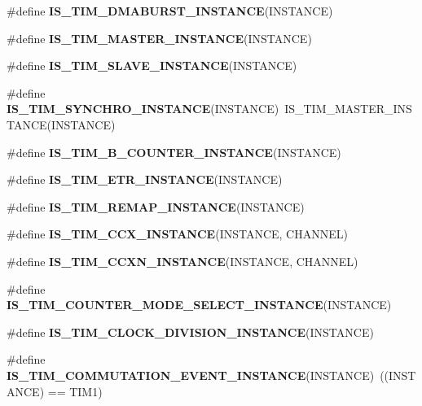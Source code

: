 \begin{DoxyCompactItemize}
\item 
\#define {\bfseries I\+S\+\_\+\+T\+I\+M\+\_\+\+D\+M\+A\+B\+U\+R\+S\+T\+\_\+\+I\+N\+S\+T\+A\+N\+CE}(I\+N\+S\+T\+A\+N\+CE)
\item 
\#define {\bfseries I\+S\+\_\+\+T\+I\+M\+\_\+\+M\+A\+S\+T\+E\+R\+\_\+\+I\+N\+S\+T\+A\+N\+CE}(I\+N\+S\+T\+A\+N\+CE)
\item 
\#define {\bfseries I\+S\+\_\+\+T\+I\+M\+\_\+\+S\+L\+A\+V\+E\+\_\+\+I\+N\+S\+T\+A\+N\+CE}(I\+N\+S\+T\+A\+N\+CE)
\item 
\mbox{\label{group___exported__macros_ga730694316ec15a3895d005f03eec720c}} 
\#define {\bfseries I\+S\+\_\+\+T\+I\+M\+\_\+\+S\+Y\+N\+C\+H\+R\+O\+\_\+\+I\+N\+S\+T\+A\+N\+CE}(I\+N\+S\+T\+A\+N\+CE)~I\+S\+\_\+\+T\+I\+M\+\_\+\+M\+A\+S\+T\+E\+R\+\_\+\+I\+N\+S\+T\+A\+N\+CE(I\+N\+S\+T\+A\+N\+CE)
\item 
\#define {\bfseries I\+S\+\_\+\+T\+I\+M\+\_\+B\+\_\+\+C\+O\+U\+N\+T\+E\+R\+\_\+\+I\+N\+S\+T\+A\+N\+CE}(I\+N\+S\+T\+A\+N\+CE)
\item 
\#define {\bfseries I\+S\+\_\+\+T\+I\+M\+\_\+\+E\+T\+R\+\_\+\+I\+N\+S\+T\+A\+N\+CE}(I\+N\+S\+T\+A\+N\+CE)
\item 
\#define {\bfseries I\+S\+\_\+\+T\+I\+M\+\_\+\+R\+E\+M\+A\+P\+\_\+\+I\+N\+S\+T\+A\+N\+CE}(I\+N\+S\+T\+A\+N\+CE)
\item 
\mbox{\label{group___exported__macros_ga6517a51ea79512a42bc53c718a77f18e}} 
\#define {\bfseries I\+S\+\_\+\+T\+I\+M\+\_\+\+C\+C\+X\+\_\+\+I\+N\+S\+T\+A\+N\+CE}(I\+N\+S\+T\+A\+N\+CE,  C\+H\+A\+N\+N\+EL)
\item 
\#define {\bfseries I\+S\+\_\+\+T\+I\+M\+\_\+\+C\+C\+X\+N\+\_\+\+I\+N\+S\+T\+A\+N\+CE}(I\+N\+S\+T\+A\+N\+CE,  C\+H\+A\+N\+N\+EL)
\item 
\#define {\bfseries I\+S\+\_\+\+T\+I\+M\+\_\+\+C\+O\+U\+N\+T\+E\+R\+\_\+\+M\+O\+D\+E\+\_\+\+S\+E\+L\+E\+C\+T\+\_\+\+I\+N\+S\+T\+A\+N\+CE}(I\+N\+S\+T\+A\+N\+CE)
\item 
\#define {\bfseries I\+S\+\_\+\+T\+I\+M\+\_\+\+C\+L\+O\+C\+K\+\_\+\+D\+I\+V\+I\+S\+I\+O\+N\+\_\+\+I\+N\+S\+T\+A\+N\+CE}(I\+N\+S\+T\+A\+N\+CE)
\item 
\mbox{\label{group___exported__macros_ga5f61206c3c8b20784f9d237dce300afd}} 
\#define {\bfseries I\+S\+\_\+\+T\+I\+M\+\_\+\+C\+O\+M\+M\+U\+T\+A\+T\+I\+O\+N\+\_\+\+E\+V\+E\+N\+T\+\_\+\+I\+N\+S\+T\+A\+N\+CE}(I\+N\+S\+T\+A\+N\+CE)~((I\+N\+S\+T\+A\+N\+CE) == T\+I\+M1)

\end{DoxyCompactItemize}

